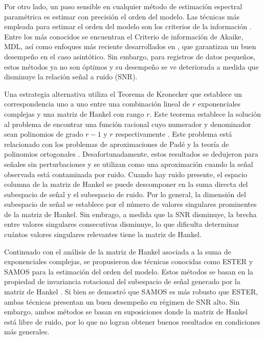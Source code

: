 Por otro lado, un paso sensible en cualquier método de estimación espectral paramétrica es estimar con precisión el orden del modelo.  Las técnicas más empleada para estimar el orden del modelo son los criterios de la información \cite{Stoica2004}. Entre los más conocidos se encuentran el Criterio de información de Akaike, MDL, así como enfoques más reciente desarrollados en \cite{Mariani2015, Nielsen2013}, que garantizan un buen desempeño en el caso asintótico. Sin embargo, para registros de datos pequeños, estos métodos ya no son óptimos y su desempeño se ve deteriorada a medida que disminuye la relación señal a ruido (SNR).

Una estrategia alternativa utiliza el Teorema de Kronecker \cite{Gantmacher1960} que establece un correspondencia uno a uno entre una combinación lineal de $r$ exponenciales complejas y una matriz de Hankel con rango $r$. Este teorema establece la solución al problema de encontrar una función racional cuyo numerador y denominador sean polinomios de grado $r-1$ y $r$ respectivamente  \cite{Fuhrmann2011}. Este problema está relacionado con los problemas de aproximaciones de Padé \cite{Gonnet2013} y la teoría de polinomios ortogonales \cite{Szego1939}.   Desafortunadamente, estos resultados se  dedujeron para señales sin perturbaciones y se utilizan como una aproximación cuando la señal observada está contaminada por ruido. Cuando hay ruido presente, el espacio columna de la matriz de Hankel se puede descomponer en la suma directa del subespacio de señal y el subespacio de ruido. Por lo general, la dimensión del subespacio de señal se establece por el número de valores singulares prominentes de la matriz de Hankel. Sin embrago, a medida que la SNR disminuye, la brecha entre valores singulares consecutivas disminuye, lo que dificulta determinar cuántos valores singulares relevantes tiene la matriz de Hankel.

Continuado con el análisis de la matriz de Hankel asociada a la suma de exponenciales complejas, se propusieron dos técnicas conocidas como ESTER \cite{Badeau2006} y SAMOS \cite{Papy2007} para la estimación del orden del modelo. Estos métodos se basan en la propiedad de invariancia rotacional del subespacio de señal generado por la matriz de Hankel \cite{Roy1989}. Si bien se demostró que SAMOS es más robusto que ESTER, ambas técnicas presentan un buen desempeño en régimen de SNR alto. Sin embargo, ambos métodos se basan en suposiciones donde la matriz de Hankel está libre de ruido, por lo que no logran obtener buenos resultados en condiciones más generales. 

